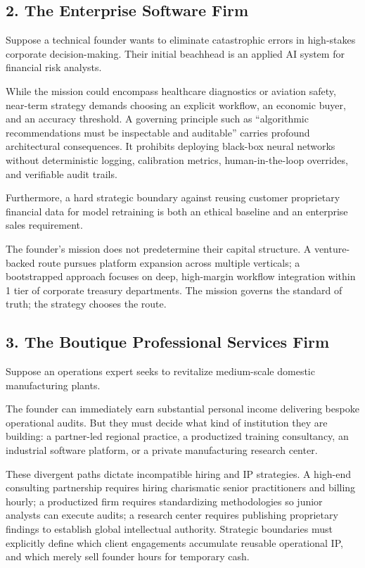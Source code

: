 \subsection{2. The Enterprise Software Firm}

Suppose a technical founder wants to eliminate catastrophic errors in high-stakes corporate decision-making. Their initial beachhead is an applied AI system for financial risk analysts.

While the mission could encompass healthcare diagnostics or aviation safety, near-term strategy demands choosing an explicit workflow, an economic buyer, and an accuracy threshold. A governing principle such as ``algorithmic recommendations must be inspectable and auditable'' carries profound architectural consequences. It prohibits deploying black-box neural networks without deterministic logging, calibration metrics, human-in-the-loop overrides, and verifiable audit trails.

Furthermore, a hard strategic boundary against reusing customer proprietary financial data for model retraining is both an ethical baseline and an enterprise sales requirement.

The founder's mission does not predetermine their capital structure. A venture-backed route pursues platform expansion across multiple verticals; a bootstrapped approach focuses on deep, high-margin workflow integration within 1 tier of corporate treasury departments. The mission governs the standard of truth; the strategy chooses the route.

\subsection{3. The Boutique Professional Services Firm}

Suppose an operations expert seeks to revitalize medium-scale domestic manufacturing plants.

The founder can immediately earn substantial personal income delivering bespoke operational audits. But they must decide what kind of institution they are building: a partner-led regional practice, a productized training consultancy, an industrial software platform, or a private manufacturing research center.

These divergent paths dictate incompatible hiring and IP strategies. A high-end consulting partnership requires hiring charismatic senior practitioners and billing hourly; a productized firm requires standardizing methodologies so junior analysts can execute audits; a research center requires publishing proprietary findings to establish global intellectual authority. Strategic boundaries must explicitly define which client engagements accumulate reusable operational IP, and which merely sell founder hours for temporary cash.

